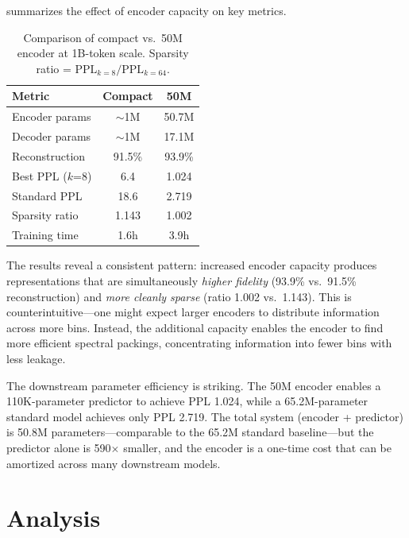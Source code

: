 \documentclass[10pt,twocolumn]{article}
\begin{document}
 summarizes the effect of encoder capacity on key metrics.

\begin{table}[t]
\centering
\caption{Comparison of compact vs.\ 50M encoder at 1B-token scale. Sparsity ratio = $\text{PPL}_{k=8} / \text{PPL}_{k=64}$.}
\label{tab:encoder_comparison}
\small
\begin{tabular}{@{}lcc@{}}
\toprule
\textbf{Metric} & \textbf{Compact} & \textbf{50M} \\
\midrule
Encoder params       & $\sim$1M    & 50.7M \\
Decoder params       & $\sim$1M    & 17.1M \\
Reconstruction       & 91.5\%      & 93.9\% \\
Best PPL ($k$=8)     & 6.4         & 1.024 \\
Standard PPL         & 18.6        & 2.719 \\
Sparsity ratio       & 1.143       & 1.002 \\
Training time        & 1.6h        & 3.9h \\
\bottomrule
\end{tabular}
\end{table}

The results reveal a consistent pattern: increased encoder capacity produces representations that are simultaneously \emph{higher fidelity} (93.9\% vs.\ 91.5\% reconstruction) and \emph{more cleanly sparse} (ratio 1.002 vs.\ 1.143). This is counterintuitive---one might expect larger encoders to distribute information across more bins. Instead, the additional capacity enables the encoder to find more efficient spectral packings, concentrating information into fewer bins with less leakage.

The downstream parameter efficiency is striking. The 50M encoder enables a 110K-parameter predictor to achieve PPL 1.024, while a 65.2M-parameter standard model achieves only PPL 2.719. The total system (encoder + predictor) is 50.8M parameters---comparable to the 65.2M standard baseline---but the predictor alone is 590$\times$ smaller, and the encoder is a one-time cost that can be amortized across many downstream models.

\section{Analysis}
\end{document}

